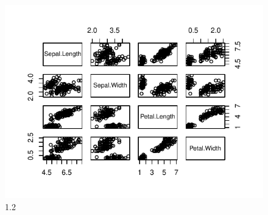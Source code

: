 \documentclass[11pt,a4paper]{article}\usepackage[]{graphicx}\usepackage[]{color}
\makeatletter
\def\maxwidth{ %
  \ifdim\Gin@nat@width>\linewidth
    \linewidth
  \else
    \Gin@nat@width
  \fi
}
\newenvironment{knitrout}{}{} %
\makeatother
\begin{document}
  \begin{figure}[H]
	\begin{center}
\begin{knitrout}
\color{fgcolor}
\includegraphics[width=\maxwidth]{figure/unnamed-chunk-2-1} 
\end{knitrout}
  \caption{1.2}
  \end{center}
  \end{figure}
\end{document}
